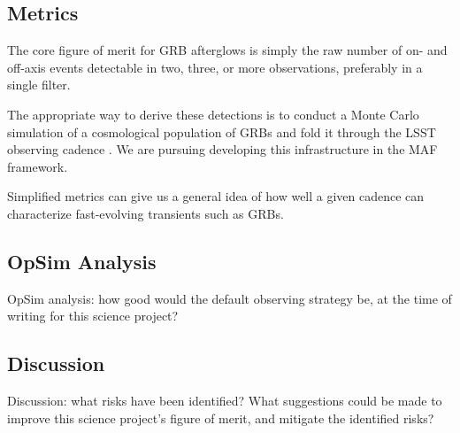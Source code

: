 
\subsection{Metrics}
\label{sec:\secname:metrics}

The core figure of merit for GRB afterglows is simply the raw number of on- and off-axis events detectable in two, three, or more observations, preferably in a single filter.

The appropriate way to derive these detections is to conduct a Monte Carlo simulation of a cosmological population of GRBs and fold it through the LSST observing cadence \citep[cf.][]{2011PASP..123.1034J}.  We are pursuing developing this infrastructure in the MAF framework.  

Simplified metrics can give us a general idea of how well a given cadence can characterize fast-evolving transients such as GRBs.



\subsection{OpSim Analysis}
\label{sec:\secname:analysis}

OpSim analysis: how good would the default observing strategy be, at
the time of writing for this science project?



\subsection{Discussion}
\label{sec:\secname:discussion}

Discussion: what risks have been identified? What suggestions could be
made to improve this science project's figure of merit, and mitigate
the identified risks?



\navigationbar
